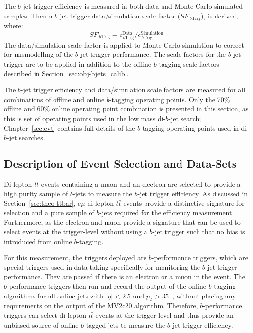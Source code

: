 The $b$-jet trigger efficiency is measured in both data and Monte-Carlo simulated samples.
Then a $b$-jet trigger data/simulation scale factor ($SF_{\,b\text{Trig}}$), is derived, where:
\begin{equation}
 SF_{\,b\text{Trig}} = \epsilon_{\,b\text{Trig}}^{\text{Data}}/\epsilon_{\,b\text{Trig}}^{\text{Simulation}}
\end{equation}
The data/simulation scale-factor is applied to Monte-Carlo simulation to correct for mismodelling of the $b$-jet trigger performance.
The scale-factors for the $b$-jet trigger are to be applied in addition to the offline $b$-tagging scale factors described in Section~\ref{sec:obj-bjets_calib}.

The $b$-jet trigger efficiency and data/simulation scale factors are measured for all combinations of offline and online $b$-tagging operating points.
Only the 70\% offline and 60\% online operating point combination is presented in this section,
as this is set of operating points used in the low mass di-$b$-jet search;
Chapter~\ref{sec:evt} contains full details of the $b$-tagging operating points used in di-$b$-jet searches.

\subsection{Description of Event Selection and Data-Sets}
\label{sec:trig-evtSel}

Di-lepton $t\bar{t}$ events containing a muon and an electron are selected to provide a high purity sample of $b$-jets to measure the $b$-jet trigger efficiency.
As discussed in Section~\ref{sec:theo-ttbar}, 
$e\mu$ di-lepton $t\bar{t}$ events provide a distinctive signature for selection and a pure sample of $b$-jets required for the efficiency measurement.
Furthermore, as the electron and muon provide a signature that can be used to select events at the trigger-level without using a $b$-jet trigger
such that no bias is introduced from online $b$-tagging.

For this measurement, the triggers deployed are $b$-performance triggers,
which are special triggers used in data-taking specifically for monitoring the $b$-jet trigger performance.
They are passed if there is an electron or a muon in the event.
The $b$-performance triggers then run and record the output of the online $b$-tagging algorithms for all online jets with $|\eta|<2.5$ and
\mbox{$p_{T}>35$~\GeV}, without placing any requirements on the output of the MV2c20 algorithm.
Therefore, $b$-performance triggers can select  di-lepton $t\bar{t}$ events at the trigger-level
and thus provide an unbiased source of online $b$-tagged jets to measure the $b$-jet trigger efficiency.

